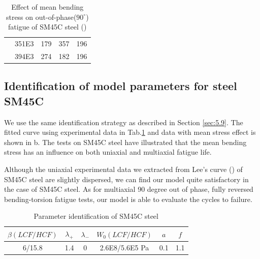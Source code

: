 \begin{table}[!h]
\begin{tabularx}{\textwidth}{XXXXX}
& 351E3                                                                                 & 179                                                                                       & 357                                                                                         & 196                                                                                         \\
& 394E3                                                                                 & 274                                                                                       & 182                                                                                         & 196                                                                                         \\ \hline
\end{tabularx}
\caption{Effect of mean bending stress on out-of-phase($90^\circ$) fatigue of SM45C steel (\cite{lee2013out})}
\label{meanSM45C}
\end{table}

\newpage
\subsection{Identification of model parameters for steel SM45C}

We use the same identification strategy as described in Section \ref{sec:5.9}. The fitted curve using experimental data in Tab.\ref{meanSM45C} and data with mean stress effect is shown in b.
The tests on SM45C steel have illustrated that the mean bending stress has an influence on both uniaxial and multiaxial fatigue life. 

Although the uniaxial experimental data we extracted from Lee's curve (\cite{lee2013out}) of SM45C steel are slightly dispersed, we can find our model quite satisfactory in the case of SM45C steel. As for multiaxial 90 degree out of phase, fully reversed bending-torsion fatigue tests, our model is able to evaluate the cycles to failure.

\begin{table}[!h]
\centering
\begin{tabular}{|c|c|c|c|c|c|}
	\hline
	\textbf{$\beta(LCF/HCF)$} & \textbf{$\lambda_+$} & \textbf{$\lambda_-$} & \textbf{$W_0(LCF/HCF)$} & \textbf{$a$}& \textbf{$f$}  \\ \hline
	6/15.8  & 1.4 &0         &2.6E8/5.6E5 Pa  & 0.1 & 1.1    \\ \hline
\end{tabular}
\caption{Parameter identification of SM45C steel}
\label{sm45cpara}
\end{table}

